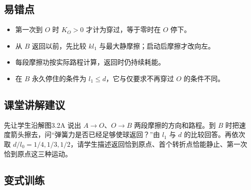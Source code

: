 \documentclass[UTF8,fontset=fandol,a4paper,11pt]{ctexart}
\begin{document}

\subsection*{易错点}

\begin{itemize}
\item 第一次到 $O$ 时 $K_O>0$ 才计为穿过，等于零时在 $O$ 停下。
\item 从 $B$ 返回以前，先比较 $kl_1$ 与最大静摩擦；启动后摩擦才改向左。
\item 每段摩擦功按实际路程计算，返回时仍持续耗能。
\item 在 $B$ 永久停住的条件为 $l_1\leq d$，它与仅要求不再穿过 $O$ 的条件不同。
\end{itemize}



\subsection*{课堂讲解建议}

先让学生沿解图3.2A 说出 $A\to O$、$O\to B$ 两段摩擦的方向和路程。到 $B$ 时把速度箭头擦去，问“弹簧力是否已经足够使球返回？”由 $l_1$ 与 $d$ 的比较回答。再依次取 $d/l_0=1/4,1/3,1/2$，请学生描述返回恰到原点、首个转折点恰能静止、第一次恰到原点这三种运动。



\subsection*{变式训练}
\end{document}
